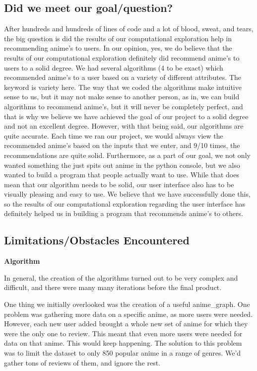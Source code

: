 \documentclass[fontsize=11pt]{article}
\begin{document}
\subsection{Did we meet our goal/question?}

After hundreds and hundreds of lines of code and a lot of blood, sweat, and tears, the big question is did the results of our computational exploration help in recommending anime's to users. In our opinion, yes, we do believe that the results of our computational exploration definitely did recommend anime's to users to a solid degree. We had several algorithms (4 to be exact) which recommended anime's to a user based on a variety of different attributes. The keyword is variety here. The way that we coded the algorithms make intuitive sense to us, but it may not make sense to another person, as in, we can build algorithms to recommend anime's, but it will never be completely perfect, and that is why we believe we have achieved the goal of our project to a solid degree and not an excellent degree. However, with that being said, our algorithms are quite accurate. Each time we ran our project, we would always view the recommended anime's based on the inputs that we enter, and 9/10 times, the recommendations are quite solid. Furthermore, as a part of our goal, we not only wanted something the just spits out anime in the python console, but we also wanted to build a program that people actually want to use. While that does mean that our algorithm needs to be solid, our user interface also has to be visually pleasing and easy to use. We believe that we have successfully done this, so the results of our computational exploration regarding the user interface has definitely helped us in building a program that recommends anime's to others. 
\subsection{Limitations/Obstacles Encountered}
\textbf{Algorithm}

\item[]In general, the creation of the algorithms turned out to be very complex and difficult, and there were many many iterations before the final product.

\item[]One thing we initially overlooked was the creation of a useful anime\_graph. One problem was gathering more data on a specific anime, as more users were needed. However, each new user added brought a whole new set of anime for which they were the only one to review. This meant that even more users were needed for data on that anime. This would keep happening. The solution to this problem was to limit the dataset to only 850 popular anime in a range of genres. We’d gather tons of reviews of them, and ignore the rest.
\end{document}
